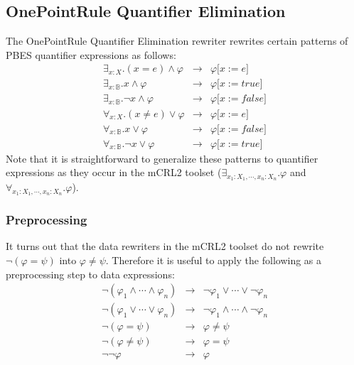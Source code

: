\documentclass{article}
\begin{document}
\subsection{OnePointRule Quantifier Elimination}

The OnePointRule Quantifier Elimination rewriter rewrites certain patterns
of PBES quantifier expressions as follows:%
\begin{equation*}
\begin{array}{lll}
\exists _{x:X}.(x=e)\wedge \varphi & \rightarrow & \varphi \lbrack x:=e] \\ 
\exists _{x:\mathbb{B}}.x\wedge \varphi & \rightarrow & \varphi \lbrack
x:=true] \\ 
\exists _{x:\mathbb{B}}.\lnot x\wedge \varphi & \rightarrow & \varphi
\lbrack x:=false] \\ 
\forall _{x:X}.(x\neq e)\vee \varphi & \rightarrow & \varphi \lbrack x:=e]
\\ 
\forall _{x:\mathbb{B}}.x\vee \varphi & \rightarrow & \varphi \lbrack
x:=false] \\ 
\forall _{x:\mathbb{B}}.\lnot x\vee \varphi & \rightarrow & \varphi \lbrack
x:=true]%
\end{array}%
\end{equation*}%
Note that it is straightforward to generalize these patterns to quantifier
expressions as they occur in the mCRL2 toolset ($\exists
_{x_{1}:X_{1},\cdots ,x_{n}:X_{n}}.\varphi $ and $\forall
_{x_{1}:X_{1},\cdots ,x_{n}:X_{n}}.\varphi $).

\subsubsection{Preprocessing}

It turns out that the data rewriters in the mCRL2 toolset do not rewrite $%
\lnot (\varphi =\psi )$ into $\varphi \neq \psi $. Therefore it is useful to
apply the following as a preprocessing step to data expressions:%
\begin{equation*}
\begin{array}{lll}
\lnot (\varphi _{1}\wedge \cdots \wedge \varphi _{n}) & \rightarrow & \lnot
\varphi _{1}\vee \cdots \vee \lnot \varphi _{n} \\ 
\lnot (\varphi _{1}\vee \cdots \vee \varphi _{n}) & \rightarrow & \lnot
\varphi _{1}\wedge \cdots \wedge \lnot \varphi _{n} \\ 
\lnot (\varphi =\psi ) & \rightarrow & \varphi \neq \psi \\ 
\lnot (\varphi \neq \psi ) & \rightarrow & \varphi =\psi \\ 
\lnot \lnot \varphi & \rightarrow & \varphi%
\end{array}%
\end{equation*}
\end{document}
